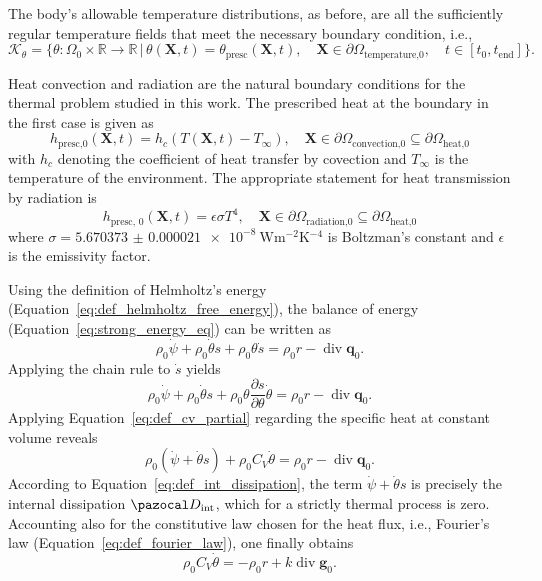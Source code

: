 The body's allowable temperature distributions, as before, are all the sufficiently regular temperature fields that meet the necessary boundary condition, i.e.,
\begin{equation}
  \mathscr K_\theta = \{\theta:\Omega_0 \times \mathbb R \to \mathbb R\,|\,\theta(\bm X, t) = \theta_\text{presc}(\bm X, t),\quad \bm X\in \partial \Omega_\text{temperature,0},\quad t\in[t_0, t_\text{end}]\}.
\end{equation}

Heat convection and radiation are the natural boundary conditions for the thermal problem studied in this work.
The prescribed heat at the boundary in the first case is given as
\begin{equation} \label{eq:heat_convection}
  h_\text{presc,0}(\bm X, t) = h_c(T(\bm X, t) - T_\infty),\quad \mathbf X \in \partial \Omega_{\text{convection,0}}\subseteq \partial\Omega_{\text{heat,0}}
\end{equation}
with \(h_c\) denoting the coefficient of heat transfer by covection and \(T_\infty\) is the temperature of the environment.
The appropriate statement for heat transmission by radiation is
\begin{equation}
  h_\text{presc, 0} (\bm X, t) =  \epsilon \sigma T^4,\quad \mathbf X \in \partial \Omega_{\text{radiation,0}}\subseteq \partial\Omega_{\text{heat,0}}
\end{equation}
where \(\sigma=\SI{5.670373(21)e-8}{\watt\meter^{-2}\kelvin^{-4}}\) is Boltzman's constant and \(\epsilon\) is the emissivity factor.


Using the definition of Helmholtz's energy (Equation~\ref{eq:def_helmholtz_free_energy}), the balance of energy (Equation~\eqref{eq:strong_energy_eq}) can be written as
\begin{equation}
  \rho_0\dot \psi + \rho_0 \dot \theta s + \rho_0 \theta \dot s = \rho_0 r - \operatorname{div}\bm q_0.
\end{equation}
Applying the chain rule to \(\dot s\) yields
\begin{equation}
  \rho_0 \dot \psi + \rho_0 \dot \theta s + \rho_0 \theta \frac{\partial s}{\partial \theta}\dot \theta  = \rho_0 r - \operatorname{div}\bm q_0.
\end{equation}
Applying Equation~\eqref{eq:def_cv_partial} regarding the specific heat at constant volume reveals
\begin{equation}
  \rho_0 (\dot \psi +  \dot \theta s) + \rho_0 C_V\dot \theta = \rho_0 r - \operatorname{div}\bm q_0.
\end{equation}
According to Equation~\eqref{eq:def_int_dissipation}, the term \(\dot \psi + \dot \theta s\) is precisely the internal dissipation \(\pazocal D_\text{int}\), which for a strictly thermal process is zero.
Accounting also for the constitutive law chosen for the heat flux, i.e., Fourier's law (Equation~\eqref{eq:def_fourier_law}), one finally obtains
\begin{equation}
  \rho_0 C_V \dot \theta = - \rho_0 r + k\operatorname{div} \bm g_0.
\end{equation}

